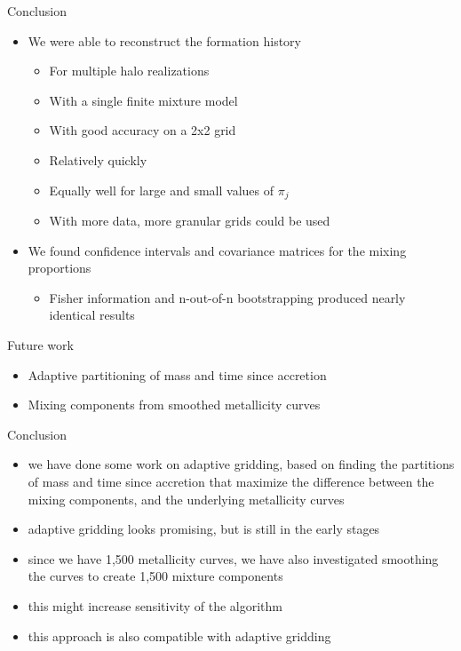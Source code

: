 \documentclass{beamer}
\begin{document}
\begin{frame}{Conclusion}
	
	
	\begin{itemize}
		\item We were able to reconstruct the formation history
		\begin{itemize}
			\item For multiple halo realizations
			\item With a single finite mixture model
			\item With good accuracy on a 2x2 grid
			\item Relatively quickly
			\item Equally well for large and small values of $\pi_j$
			\item With more data, more granular grids could be used
		\end{itemize}
		\item We found confidence intervals and covariance matrices for the mixing proportions
		\begin{itemize}
			\item Fisher information and n-out-of-n bootstrapping produced nearly identical results
		\end{itemize}
	\end{itemize}	
	
	
	Future work
	\begin{itemize}
		\item Adaptive partitioning of mass and time since accretion
		\item Mixing components from smoothed metallicity curves
	\end{itemize}	
	
\end{frame}
\begin{frame}[shrink]{Conclusion}
	
	\begin{itemize}
		\item we have done some work on adaptive gridding, based on finding the partitions of mass and time since accretion that maximize the difference between the mixing components, and the underlying metallicity curves
		\item adaptive gridding looks promising, but is still in the early stages
		
		\item since we have 1,500 metallicity curves, we have also investigated smoothing the curves to create 1,500 mixture components
		\item this might increase sensitivity of the algorithm
		\item this approach is also compatible with adaptive gridding
	\end{itemize}
	
\end{frame}
\end{document}
